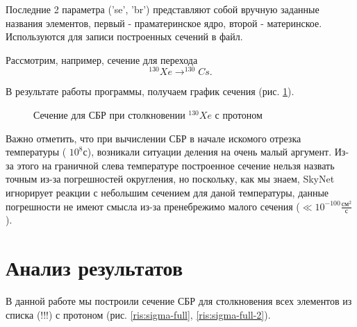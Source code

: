 \documentclass[%
master,    %
natbib,      %
subf,        %
href,        %
colorlinks,  %
]{disser}
\begin{document}
Последние 2 параметра ('se', 'br') представляют собой вручную заданные названия элементов, первый - праматеринское ядро, второй - материнское. Используются для записи построенных сечений в файл. 

Рассмотрим, например, сечение для перехода 
$$^{130}Xe \to ^{130}Cs.$$

В результате работы программы, получаем график сечения  (рис. \ref{ris:1}).

\begin{figure}
	\caption{Сечение для СБР при столкновении $^{130}Xe$ с протоном}
	\label{ris:1}
\end{figure}

Важно отметить, что при вычислении СБР в начале искомого отрезка температуры ($\text{~}10^8\text{с}$), возникали ситуации деления на очень малый аргумент. Из-за этого на граничной слева температуре построенное сечение нельзя назвать точным из-за погрешностей округления, но поскольку, как мы знаем, SkyNet игнорирует реакции с небольшим сечением для даной температуры, данные погрешности не имеют смысла из-за пренебрежимо малого сечения ($\ll 10^{-100} \frac{\text{см}^2}{\text{с}}$).

\section{Анализ результатов}
В данной работе мы построили сечение СБР для столкновения всех элементов из списка (!!!) с протоном (рис. \ref{ris:sigma-full}, \ref{ris:sigma-full-2}).
\end{document}
